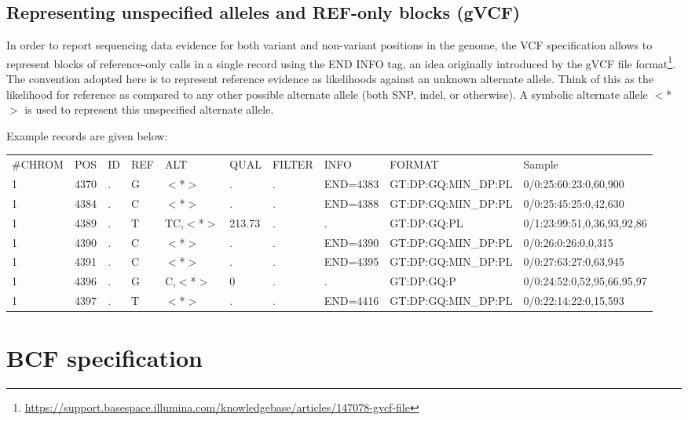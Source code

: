 \documentclass[8pt]{article}
\begin{document}
\subsection{Representing unspecified alleles and REF-only blocks (gVCF)}
In order to report sequencing data evidence for both variant and non-variant
positions in the genome, the VCF specification allows to represent blocks of reference-only calls in a single record
using the END INFO tag, an idea originally introduced by the gVCF file format\footnote{\url{https://support.basespace.illumina.com/knowledgebase/articles/147078-gvcf-file}}.
The convention adopted here is to represent reference evidence as likelihoods against an
unknown alternate allele. Think of this as the likelihood for reference as compared to any other possible alternate
allele (both SNP, indel, or otherwise). A symbolic alternate allele $<$*$>$
is used to represent this unspecified alternate allele.

Example records are given below:
\scriptsize
\begin{flushleft}
\begin{tabular}{ l l l l l l l l l l }
\#CHROM & POS & ID & REF & ALT & QUAL & FILTER & INFO & FORMAT & Sample \\
1 & 4370 & . & G & $<$*$>$ & . & . & END=4383 & GT:DP:GQ:MIN\_DP:PL & 0/0:25:60:23:0,60,900 \\
1 & 4384 & . & C & $<$*$>$ & . & . & END=4388 & GT:DP:GQ:MIN\_DP:PL & 0/0:25:45:25:0,42,630 \\
1 & 4389 & . & T & TC,$<$*$>$ & 213.73 & . & . & GT:DP:GQ:PL & 0/1:23:99:51,0,36,93,92,86 \\
1 & 4390 & . & C & $<$*$>$ & . & . & END=4390 & GT:DP:GQ:MIN\_DP:PL & 0/0:26:0:26:0,0,315 \\
1 & 4391 & . & C & $<$*$>$ & . & . & END=4395 & GT:DP:GQ:MIN\_DP:PL & 0/0:27:63:27:0,63,945 \\
1 & 4396 & . & G & C,$<$*$>$ & 0 & . & . & GT:DP:GQ:P & 0/0:24:52:0,52,95,66,95,97 \\
1 & 4397 & . & T & $<$*$>$ & . & . & END=4416 & GT:DP:GQ:MIN\_DP:PL & 0/0:22:14:22:0,15,593 \\
\end{tabular}
\end{flushleft}
\normalsize

\pagebreak
\section{BCF specification}
\end{document}
